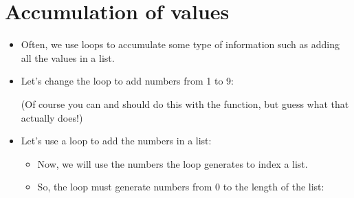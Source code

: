 \documentclass[letterpaper,10pt,english]{sphinxmanual}
\begin{document}
\section{Accumulation of values}
\label{\detokenize{lecture_notes/lec09_loops1_while:accumulation-of-values}}\begin{itemize}
\item {} 
Often, we use loops to accumulate some type of information such as
adding all the values in a list.

\item {} 
Let’s change the loop to add numbers from 1 to 9:

\begin{sphinxVerbatim}[commandchars=\\\{\}]
  
  
   
      
      
\end{sphinxVerbatim}

(Of course you can and should do this with the 
function, but guess what that actually does!)

\item {} 
Let’s use a loop to add the numbers in a list:
\begin{itemize}
\item {} 
Now, we will use the numbers the loop generates to index a list.

\item {} 
So, the loop must generate numbers from 0 to the length of the list:

\end{itemize}

\begin{sphinxVerbatim}[commandchars=\\\{\}]
  \PYG{p}{[}     \PYGZbs{}
                   \PYGZbs{}
                   \PYGZbs{}
               \PYG{p}{]}


\end{sphinxVerbatim}
\end{itemize}
\end{document}
